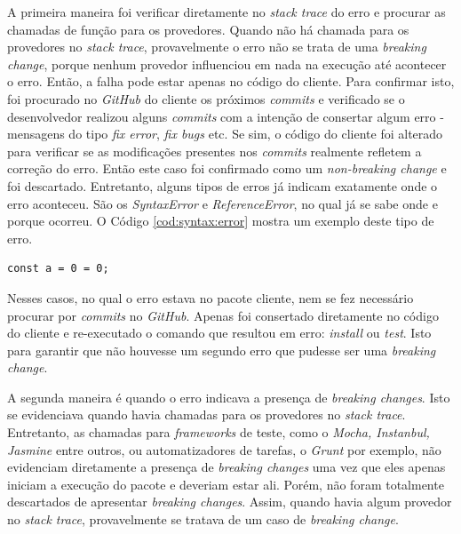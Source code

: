 A primeira maneira foi verificar diretamente no \textit{stack trace} do erro e procurar as chamadas de função para os provedores. Quando não há chamada para os provedores no \textit{stack trace}, provavelmente o erro não se trata de uma \textit{breaking change}, porque nenhum provedor influenciou em nada na execução até acontecer o erro. Então, a falha pode estar apenas no código do cliente. Para confirmar isto, foi procurado no \textit{GitHub} do cliente os próximos \textit{commits} e verificado se o desenvolvedor realizou alguns \textit{commits} com a intenção de consertar algum erro - mensagens do tipo \textit{fix error}, \textit{fix bugs} etc. Se sim, o código do cliente foi alterado para verificar se as modificações presentes nos \textit{commits} realmente refletem a correção do erro. Então este caso foi confirmado como um \textit{non-breaking change} e foi descartado. Entretanto, alguns tipos de erros já indicam exatamente onde o erro aconteceu. São os \textit{SyntaxError} e \textit{ReferenceError}, no qual já se sabe onde e porque ocorreu. O Código \ref{cod:syntax:error} mostra um exemplo deste tipo de erro.

\begin{lstlisting}[style=Javascript, label=cod:syntax:error, caption={Código com um Reference Error}]
const a = 0 = 0;
\end{lstlisting}

Nesses casos, no qual o erro estava no pacote cliente, nem se fez necessário procurar por \textit{commits} no \textit{GitHub}. Apenas foi consertado diretamente no código do cliente e re-executado o comando que resultou em erro: \textit{install} ou \textit{test}. Isto para garantir que não houvesse um segundo erro que pudesse ser uma \textit{breaking change}.

A segunda maneira é quando o erro indicava a presença de \textit{breaking changes}. Isto se evidenciava quando havia chamadas para os provedores no \textit{stack trace}. Entretanto, as chamadas para \textit{frameworks} de teste, como o \textit{Mocha, Instanbul, Jasmine} entre outros, ou automatizadores de tarefas, o \textit{Grunt} por exemplo, não evidenciam diretamente a presença de \textit{breaking changes} uma vez que eles apenas iniciam a execução do pacote e deveriam estar ali. Porém, não foram totalmente descartados de apresentar \textit{breaking changes}. Assim, quando havia algum provedor no \textit{stack trace}, provavelmente se tratava de um caso de \textit{breaking change}.

